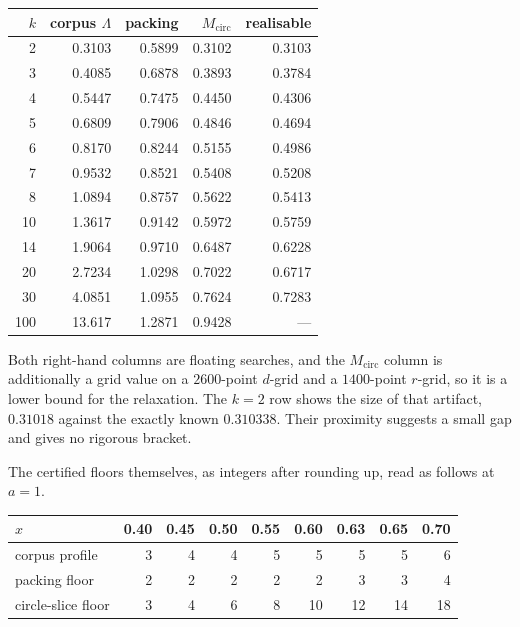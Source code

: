 \documentclass[11pt]{article}
\begin{document}
\begin{center}
\begin{tabular}{@{}rrrrr@{}}
\toprule
$k$ & corpus $\Lambda$ & packing & $M_{\mathrm{circ}}$ & realisable \\
\midrule
2 & 0.3103 & 0.5899 & 0.3102 & 0.3103 \\
3 & 0.4085 & 0.6878 & 0.3893 & 0.3784 \\
4 & 0.5447 & 0.7475 & 0.4450 & 0.4306 \\
5 & 0.6809 & 0.7906 & 0.4846 & 0.4694 \\
6 & 0.8170 & 0.8244 & 0.5155 & 0.4986 \\
7 & 0.9532 & 0.8521 & 0.5408 & 0.5208 \\
8 & 1.0894 & 0.8757 & 0.5622 & 0.5413 \\
10 & 1.3617 & 0.9142 & 0.5972 & 0.5759 \\
14 & 1.9064 & 0.9710 & 0.6487 & 0.6228 \\
20 & 2.7234 & 1.0298 & 0.7022 & 0.6717 \\
30 & 4.0851 & 1.0955 & 0.7624 & 0.7283 \\
100 & 13.617 & 1.2871 & 0.9428 & --- \\
\bottomrule
\end{tabular}
\end{center}

Both right-hand columns are floating searches, and the $M_{\mathrm{circ}}$
column is additionally a grid value on a $2600$-point $d$-grid and a
$1400$-point $r$-grid, so it is a lower bound for the relaxation.  The $k=2$
row shows the size of that artifact, $0.31018$ against the exactly known
$0.310338$.  Their proximity suggests a small gap and gives no rigorous
bracket.

The certified floors themselves, as integers after rounding up, read as
follows at $a=1$.

\begin{center}
\begin{tabular}{@{}lrrrrrrrr@{}}
\toprule
$x$ & 0.40 & 0.45 & 0.50 & 0.55 & 0.60 & 0.63 & 0.65 & 0.70 \\
\midrule
corpus profile & 3 & 4 & 4 & 5 & 5 & 5 & 5 & 6 \\
packing floor & 2 & 2 & 2 & 2 & 2 & 3 & 3 & 4 \\
circle-slice floor & 3 & 4 & 6 & 8 & 10 & 12 & 14 & 18 \\
\bottomrule
\end{tabular}
\end{center}
\end{document}
